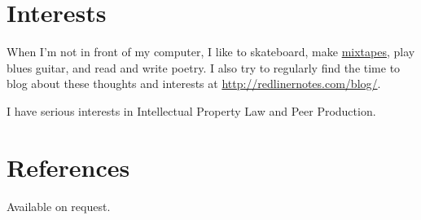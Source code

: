 \documentclass[margintitle,line]{res}
\begin{document}
\begin{resume}

\section{Interests}

When I'm not in front of my computer, I like to skateboard, make
\href{http://soundcloud.com/redlinernotes}{mixtapes}, play blues guitar, and
read and write poetry. I also try to regularly find the time to blog about
these thoughts and interests at \url{http://redlinernotes.com/blog/}.

I have serious interests in Intellectual Property Law and Peer Production.


\section{References}

Available on request.

\end{resume}
\end{document}
